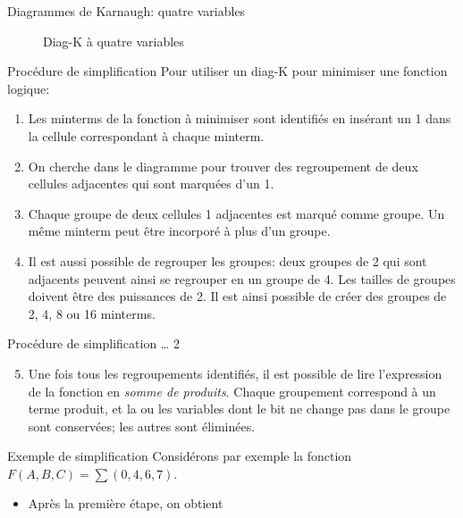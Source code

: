 \documentclass[presentation]{beamer}
\begin{document}
\begin{frame}[label={sec:orgdecb871}]{Diagrammes de Karnaugh: quatre variables}
\begin{figure}[htbp]
\centering

\caption{\label{fig:org5bddc60}Diag-K à quatre variables}
\end{figure}
\end{frame}

\begin{frame}[label={sec:orgb775d32}]{Procédure de simplification}
Pour utiliser un diag-K pour minimiser une fonction logique: 

\begin{enumerate}
\item Les minterms de la fonction à minimiser sont identifiés en insérant
un 1 dans la cellule correspondant à chaque minterm.
\item On cherche dans le diagramme pour trouver des regroupement de deux
cellules adjacentes qui sont marquées d'un 1.
\item Chaque groupe de deux cellules 1 adjacentes est marqué comme
groupe. Un même minterm peut être incorporé à plus d'un groupe.
\item Il est aussi possible de regrouper les groupes: deux groupes de 2
qui sont adjacents peuvent ainsi se regrouper en un groupe
de 4. Les tailles de groupes doivent être des puissances de 2. Il
est ainsi possible de créer des groupes de 2, 4, 8 ou 16 minterms.
\end{enumerate}
\end{frame}

\begin{frame}[label={sec:orgb35eb3c}]{Procédure de simplification \ldots{} 2}
\begin{enumerate}
\setcounter{enumi}{4}
\item Une fois tous les regroupements identifiés, il est possible de lire
l'expression de la fonction en \emph{somme de produits}. Chaque groupement
correspond à un terme produit, et la ou les variables dont le bit ne
change pas dans le groupe sont conservées; les autres sont
éliminées.
\end{enumerate}
\end{frame}

\begin{frame}[label={sec:org637abd9}]{Exemple de simplification}
Considérons par exemple la fonction \(F(A,B,C) = \sum (0, 4, 6, 7)\). 

\begin{itemize}
\item Après la première étape, on obtient
\end{itemize}

\begin{center}

\label{org0be2bd2}
\end{center}
\end{frame}
\end{document}
